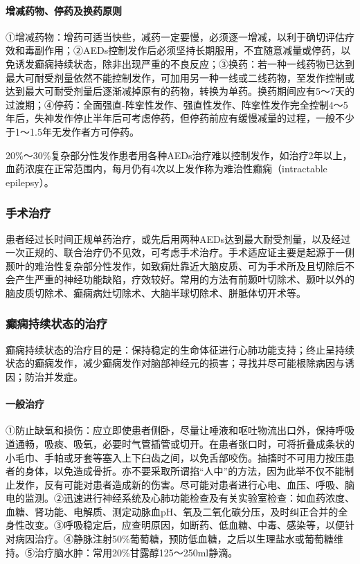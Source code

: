 \paragraph{增减药物、停药及换药原则}

①增减药物：增药可适当快些，减药一定要慢，必须逐一增减，以利于确切评估疗效和毒副作用；②AEDs控制发作后必须坚持长期服用，不宜随意减量或停药，以免诱发癫痫持续状态，除非出现严重的不良反应；③换药：若一种一线药物已达到最大可耐受剂量依然不能控制发作，可加用另一种一线或二线药物，至发作控制或达到最大可耐受剂量后逐渐减掉原有的药物，转换为单药。换药期间应有5～7天的过渡期；④停药：全面强直-阵挛性发作、强直性发作、阵挛性发作完全控制4～5年后，失神发作停止半年后可考虑停药，但停药前应有缓慢减量的过程，一般不少于1～1.5年无发作者方可停药。

20\%～30\%复杂部分性发作患者用各种AEDs治疗难以控制发作，如治疗2年以上，血药浓度在正常范围内，每月仍有4次以上发作称为难治性癫痫（intractable
epilepsy）。

\subsubsection{手术治疗}

患者经过长时间正规单药治疗，或先后用两种AEDs达到最大耐受剂量，以及经过一次正规的、联合治疗仍不见效，可考虑手术治疗。手术适应证主要是起源于一侧颞叶的难治性复杂部分性发作，如致痫灶靠近大脑皮质、可为手术所及且切除后不会产生严重的神经功能缺陷，疗效较好。常用的方法有前颞叶切除术、颞叶以外的脑皮质切除术、癫痫病灶切除术、大脑半球切除术、胼胝体切开术等。

\subsubsection{癫痫持续状态的治疗}

癫痫持续状态的治疗目的是：保持稳定的生命体征进行心肺功能支持；终止呈持续状态的癫痫发作，减少癫痫发作对脑部神经元的损害；寻找并尽可能根除病因与诱因；防治并发症。

\paragraph{一般治疗}

①防止缺氧和损伤：应立即使患者侧卧，尽量让唾液和呕吐物流出口外，保持呼吸道通畅，吸痰、吸氧，必要时气管插管或切开。在患者张口时，可将折叠成条状的小毛巾、手帕或牙套等塞入上下臼齿之间，以免舌部咬伤。抽搐时不可用力按压患者的身体，以免造成骨折。亦不要采取所谓掐“人中”的方法，因为此举不仅不能制止发作，反有可能对患者造成新的伤害。尽可能对患者进行心电、血压、呼吸、脑电的监测。②迅速进行神经系统及心肺功能检查及有关实验室检查：如血药浓度、血糖、肾功能、电解质、测定动脉血pH、氧及二氧化碳分压，及时纠正合并的全身性改变。③呼吸稳定后，应查明原因，如断药、低血糖、中毒、感染等，以便针对病因治疗。④静脉注射50\%葡萄糖，预防低血糖，之后以生理盐水或葡萄糖维持。⑤治疗脑水肿：常用20\%甘露醇125～250ml静滴。

